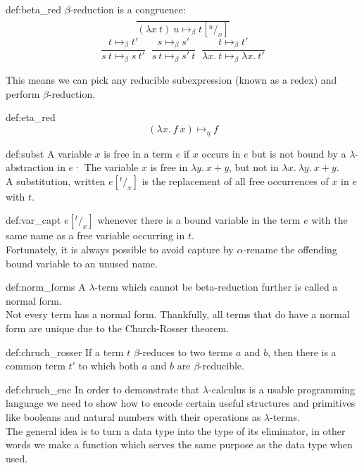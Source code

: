 \documentclass[landscape, 8pt]{extarticle}
\begin{document}
\begin{multicols}{3}
\begin{dfn}{def:beta_red}{}
$\beta$-reduction is a congruence:
\[\frac{}{(\lambda x\:t)\:u \mapsto_\beta t[^u/_x]}\]
\[\frac{t \mapsto_\beta t'}{s\:t \mapsto_\beta s\:t'}\;\;\frac{s \mapsto_\beta s'}{s\:t \mapsto_\beta s'\:t}\;\;\frac{t \mapsto_\beta t'}{\lambda x.\:t \mapsto_\beta \lambda x.\:t'}\]

This means we can pick any reducible subexpression (known as a redex) and perform $\beta$-reduction.   
\end{dfn}

\newpage

\begin{dfn}{def:eta_red}{}
\[(\lambda x.\:f\:x) \mapsto_\eta f\]  
\end{dfn}

\begin{dfn}[Substitution]{def:subst}{}
A variable $x$ is free in a term $e$ if $x$ occurs in $e$ but is not bound by a $\lambda$-abstraction in $e$· The variable $x$ is free in $\lambda y.\:x+y$, but not in $\lambda x.\:\lambda y.\:x+y$.\\
A substitution, written $e[^t/_x]$ is the replacement of all free occurrences of $x$ in $e$ with $t$.
\end{dfn}

\begin{dfn}{def:var_capt}{}
$e[^t/_x]$ whenever there is a bound variable in the term $e$ with the same name as a free variable occurring in $t$.\\
Fortunately, it is always possible to avoid capture by $\alpha$-rename the offending bound variable to an unused name.
\end{dfn}

\begin{dfn}{def:norm_forms}{}
A $\lambda$-term which cannot be beta-reduction further is called a normal form.\\
Not every term has a normal form. Thankfully, all terms that do have a normal form are unique due to the Church-Rosser theorem.
\end{dfn}

\begin{thm}{def:chruch_rosser}{}
If a term $t$ $\beta$-reduces to two terms $a$ and $b$, then there is a common term $t'$ to which both $a$ and $b$ are $\beta$-reducible.
\end{thm}

\begin{dfn}{def:chruch_enc}{}
In order to demonstrate that $\lambda$-calculus is a usable programming language we need to show how to encode certain useful structures and primitives like booleans and natural numbers with their operations as $\lambda$-terms.\\
The general idea is to turn a data type into the type of its eliminator, in other words we make a function which serves the same purpose as the data type when used.
\end{dfn}


\end{multicols}
\end{document}
